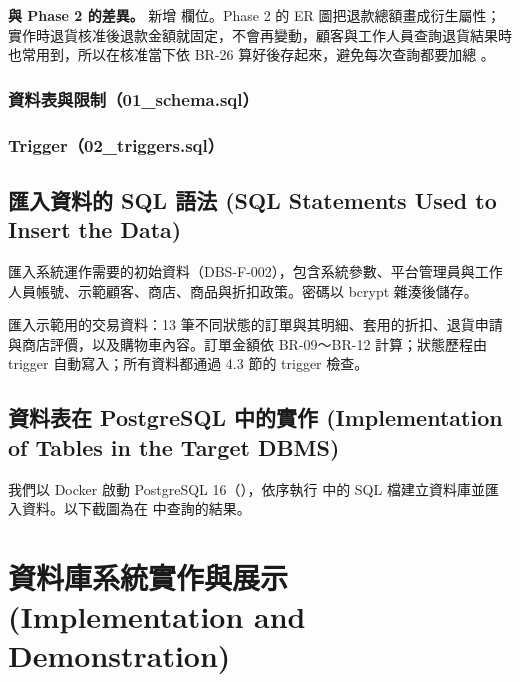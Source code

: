 \textbf{與 Phase 2 的差異。} 新增  欄位。Phase 2 的 ER 圖把退款總額畫成衍生屬性；實作時退貨核准後退款金額就固定，不會再變動，顧客與工作人員查詢退貨結果時也常用到，所以在核准當下依 BR-26 算好後存起來，避免每次查詢都要加總 。

\subsubsection{資料表與限制（01\_schema.sql）}

\subsubsection{Trigger（02\_triggers.sql）}

\clearpage
\subsection{匯入資料的 SQL 語法 (SQL Statements Used to Insert the Data)}

 匯入系統運作需要的初始資料（DBS-F-002），包含系統參數、平台管理員與工作人員帳號、示範顧客、商店、商品與折扣政策。密碼以 bcrypt 雜湊後儲存。


 匯入示範用的交易資料：13 筆不同狀態的訂單與其明細、套用的折扣、退貨申請與商店評價，以及購物車內容。訂單金額依 BR-09～BR-12 計算；狀態歷程由 trigger 自動寫入；所有資料都通過 4.3 節的 trigger 檢查。


\clearpage
\subsection{資料表在 PostgreSQL 中的實作 (Implementation of Tables in the Target DBMS)}

我們以 Docker 啟動 PostgreSQL 16（），依序執行  中的 SQL 檔建立資料庫並匯入資料。以下截圖為在  中查詢的結果。



\clearpage
\section{資料庫系統實作與展示 (Implementation and Demonstration)}


